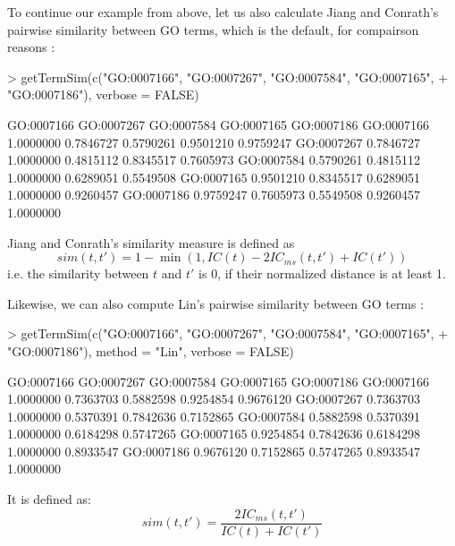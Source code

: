 \documentclass[12pt,a4paper]{article}
\begin{document}
To continue our example from above, let us also calculate Jiang and Conrath's pairwise similarity between GO terms, which is the default, for compairson reasons \cite{Jiang98}:
\begin{Schunk}
\begin{Sinput}
> getTermSim(c("GO:0007166", "GO:0007267", "GO:0007584", "GO:0007165", 
+     "GO:0007186"), verbose = FALSE)
\end{Sinput}
\begin{Soutput}
           GO:0007166 GO:0007267 GO:0007584 GO:0007165 GO:0007186
GO:0007166  1.0000000  0.7846727  0.5790261  0.9501210  0.9759247
GO:0007267  0.7846727  1.0000000  0.4815112  0.8345517  0.7605973
GO:0007584  0.5790261  0.4815112  1.0000000  0.6289051  0.5549508
GO:0007165  0.9501210  0.8345517  0.6289051  1.0000000  0.9260457
GO:0007186  0.9759247  0.7605973  0.5549508  0.9260457  1.0000000
\end{Soutput}
\end{Schunk}
Jiang and Conrath's similarity measure is defined as
\begin{equation}
sim(t,t') = 1 - \min(1, IC(t) - 2IC_{ms}(t,t') + IC(t'))
\end{equation}
i.e. the similarity between $t$ and $t'$ is 0, if their normalized distance is at least 1.

Likewise, we can also compute Lin's pairwise similarity between GO terms \cite{Lin98}:
\begin{Schunk}
\begin{Sinput}
> getTermSim(c("GO:0007166", "GO:0007267", "GO:0007584", "GO:0007165", 
+     "GO:0007186"), method = "Lin", verbose = FALSE)
\end{Sinput}
\begin{Soutput}
           GO:0007166 GO:0007267 GO:0007584 GO:0007165 GO:0007186
GO:0007166  1.0000000  0.7363703  0.5882598  0.9254854  0.9676120
GO:0007267  0.7363703  1.0000000  0.5370391  0.7842636  0.7152865
GO:0007584  0.5882598  0.5370391  1.0000000  0.6184298  0.5747265
GO:0007165  0.9254854  0.7842636  0.6184298  1.0000000  0.8933547
GO:0007186  0.9676120  0.7152865  0.5747265  0.8933547  1.0000000
\end{Soutput}
\end{Schunk}
It is defined as:
\begin{equation}
sim(t,t') = \frac{2IC_{ms}(t,t')}{IC(t) + IC(t')}\label{eq:Lin}
\end{equation}
\end{document}
